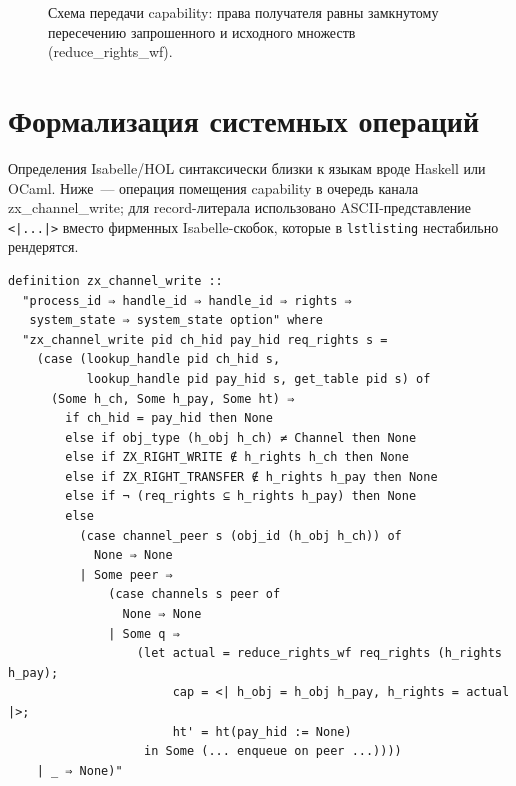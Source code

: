 \documentclass[11pt,a4paper]{article}
\newcommand{\isabel}[1]{{\isabelleit #1}}
\newcommand{\lemmaname}[1]{\isabel{#1}}
\begin{document}
\begin{figure}[ht]
	\centering
	\caption{Схема передачи \textenglish{capability}: права получателя равны
		замкнутому пересечению запрошенного и исходного множеств
		(\lemmaname{reduce\_rights\_wf}).}
	\label{fig:transfer}
\end{figure}

\section{Формализация системных операций}

Определения Isabelle/HOL синтаксически близки к языкам вроде Haskell или
OCaml. Ниже~--- операция помещения \textenglish{capability} в очередь
канала \lemmaname{zx\_channel\_write}; для record-литерала использовано
ASCII-представление \texttt{<|...|>} вместо фирменных Isabelle-скобок,
которые в \texttt{lstlisting} нестабильно рендерятся.
\begin{lstlisting}
definition zx_channel_write ::
  "process_id ⇒ handle_id ⇒ handle_id ⇒ rights ⇒
   system_state ⇒ system_state option" where
  "zx_channel_write pid ch_hid pay_hid req_rights s =
    (case (lookup_handle pid ch_hid s,
           lookup_handle pid pay_hid s, get_table pid s) of
      (Some h_ch, Some h_pay, Some ht) ⇒
        if ch_hid = pay_hid then None
        else if obj_type (h_obj h_ch) ≠ Channel then None
        else if ZX_RIGHT_WRITE ∉ h_rights h_ch then None
        else if ZX_RIGHT_TRANSFER ∉ h_rights h_pay then None
        else if ¬ (req_rights ⊆ h_rights h_pay) then None
        else
          (case channel_peer s (obj_id (h_obj h_ch)) of
            None ⇒ None
          | Some peer ⇒
              (case channels s peer of
                None ⇒ None
              | Some q ⇒
                  (let actual = reduce_rights_wf req_rights (h_rights h_pay);
                       cap = <| h_obj = h_obj h_pay, h_rights = actual |>;
                       ht' = ht(pay_hid := None)
                   in Some (... enqueue on peer ...))))
    | _ ⇒ None)"
\end{lstlisting}
\end{document}

